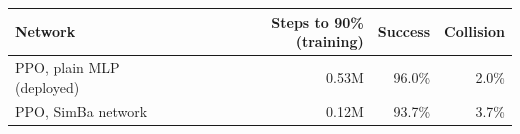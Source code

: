 \begin{tabular}{lrrr}
\toprule
Network & Steps to 90\% (training) & Success & Collision \\
\midrule
PPO, plain MLP (deployed) & 0.53M & 96.0\% & 2.0\% \\
PPO, SimBa network & 0.12M & 93.7\% & 3.7\% \\
\bottomrule
\end{tabular}
